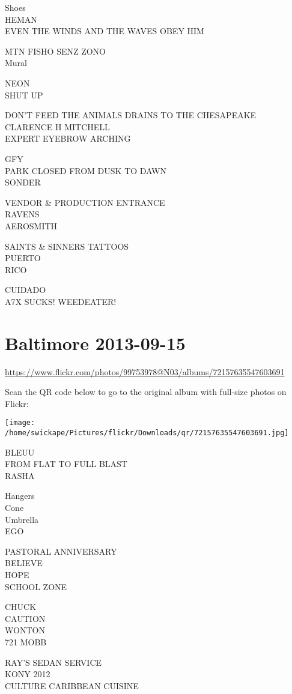 \documentclass[10pt,letterpaper]{article}
\begin{document}
Shoes\\
HEMAN\\
EVEN THE WINDS AND THE WAVES OBEY HIM

MTN FISHO SENZ ZONO\\
Mural

NEON\\
SHUT UP

DON'T FEED THE ANIMALS DRAINS TO THE CHESAPEAKE\\
CLARENCE H MITCHELL\\
EXPERT EYEBROW ARCHING

GFY\\
PARK CLOSED FROM DUSK TO DAWN\\
SONDER

VENDOR \& PRODUCTION ENTRANCE\\
RAVENS\\
AEROSMITH

SAINTS \& SINNERS TATTOOS\\
PUERTO\\
RICO

CUIDADO\\
A7X SUCKS!  WEEDEATER!


\section*{Baltimore 2013-09-15}

\url{https://www.flickr.com/photos/99753978@N03/albums/72157635547603691}

Scan the QR code below to go to the original album with full-size photos on Flickr:

\texttt{[image: /home/swickape/Pictures/flickr/Downloads/qr/72157635547603691.jpg]}


BLEUU\\
FROM FLAT TO FULL BLAST\\
RASHA

Hangers\\
Cone\\
Umbrella\\
EGO

PASTORAL ANNIVERSARY\\
BELIEVE\\
HOPE\\
SCHOOL ZONE

CHUCK\\
CAUTION\\
WONTON\\
721 MOBB

RAY'S SEDAN SERVICE\\
KONY 2012\\
CULTURE CARIBBEAN CUISINE
\end{document}
